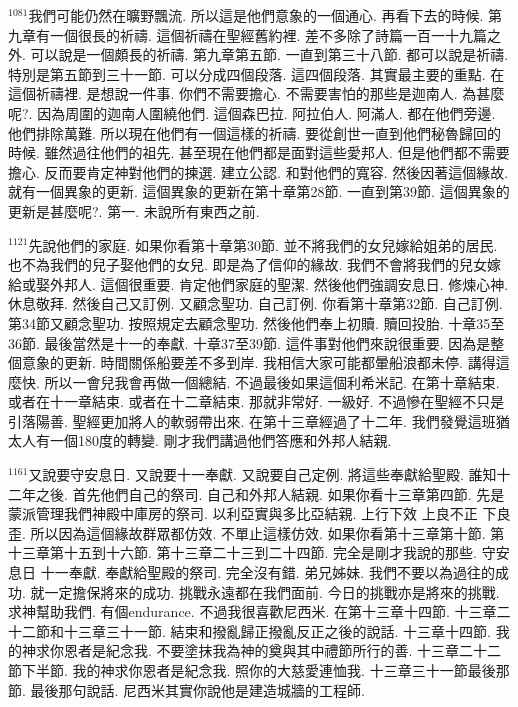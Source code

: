 \documentclass{book}
\begin{document}
$^{1081}$我們可能仍然在曠野飄流.
所以這是他們意象的一個通心.
再看下去的時候.
第九章有一個很長的祈禱.
這個祈禱在聖經舊約裡.
差不多除了詩篇一百一十九篇之外.
可以說是一個頗長的祈禱.
第九章第五節.
一直到第三十八節.
都可以說是祈禱.
特別是第五節到三十一節.
可以分成四個段落.
這四個段落.
其實最主要的重點.
在這個祈禱裡.
是想說一件事.
你們不需要擔心.
不需要害怕的那些是迦南人.
為甚麼呢?.
因為周圍的迦南人圍繞他們.
這個森巴拉.
阿拉伯人.
阿滿人.
都在他們旁邊.
他們排除萬難.
所以現在他們有一個這樣的祈禱.
要從創世一直到他們秘魯歸回的時候.
雖然過往他們的祖先.
甚至現在他們都是面對這些愛邦人.
但是他們都不需要擔心.
反而要肯定神對他們的揀選.
建立公認.
和對他們的寬容.
然後因著這個緣故.
就有一個異象的更新.
這個異象的更新在第十章第28節.
一直到第39節.
這個異象的更新是甚麼呢?.
第一.
未說所有東西之前.

$^{1121}$先說他們的家庭.
如果你看第十章第30節.
並不將我們的女兒嫁給姐弟的居民.
也不為我們的兒子娶他們的女兒.
即是為了信仰的緣故.
我們不會將我們的兒女嫁給或娶外邦人.
這個很重要.
肯定他們家庭的聖潔.
然後他們強調安息日.
修煉心神.
休息敬拜.
然後自己又訂例.
又顧念聖功.
自己訂例.
你看第十章第32節.
自己訂例.
第34節又顧念聖功.
按照規定去顧念聖功.
然後他們奉上初贖.
贖回投胎.
十章35至36節.
最後當然是十一的奉獻.
十章37至39節.
這件事對他們來說很重要.
因為是整個意象的更新.
時間關係船要差不多到岸.
我相信大家可能都暈船浪都未停.
講得這麼快.
所以一會兒我會再做一個總結.
不過最後如果這個利希米記.
在第十章結束.
或者在十一章結束.
或者在十二章結束.
那就非常好.
一級好.
不過慘在聖經不只是引落陽善.
聖經更加將人的軟弱帶出來.
在第十三章經過了十二年.
我們發覺這班猶太人有一個180度的轉變.
剛才我們講過他們答應和外邦人結親.

$^{1161}$又說要守安息日.
又說要十一奉獻.
又說要自己定例.
將這些奉獻給聖殿.
誰知十二年之後.
首先他們自己的祭司.
自己和外邦人結親.
如果你看十三章第四節.
先是蒙派管理我們神殿中庫房的祭司.
以利亞實與多比亞結親.
上行下效 上良不正 下良歪.
所以因為這個緣故群眾都仿效.
不單止這樣仿效.
如果你看第十三章第十節.
第十三章第十五到十六節.
第十三章二十三到二十四節.
完全是剛才我說的那些.
守安息日 十一奉獻.
奉獻給聖殿的祭司.
完全沒有錯.
弟兄姊妹.
我們不要以為過往的成功.
就一定擔保將來的成功.
挑戰永遠都在我們面前.
今日的挑戰亦是將來的挑戰.
求神幫助我們.
有個endurance.
不過我很喜歡尼西米.
在第十三章十四節.
十三章二十二節和十三章三十一節.
結束和撥亂歸正撥亂反正之後的說話.
十三章十四節.
我的神求你恩者是紀念我.
不要塗抹我為神的奠與其中禮節所行的善.
十三章二十二節下半節.
我的神求你恩者是紀念我.
照你的大慈愛連恤我.
十三章三十一節最後那節.
最後那句說話.
尼西米其實你說他是建造城牆的工程師.
\end{document}
